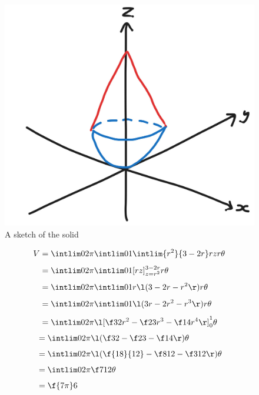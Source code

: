 \documentclass[a4paper]{article}
\begin{document}
\begin{figure}[h]
	\centering
	\includegraphics[scale=0.35]{Q3-sketch}
	\caption{A sketch of the solid}
\end{figure}

\begin{align*}
V &= \intlim 0{2\pi} {\intlim 01 {\intlim {r^2}{3-2r} r z} r} \theta\\[1ex]
&= \intlim 0{2\pi} {\intlim 01 {[rz]_{z=r^2}^{3-2r}} r} \theta\\[1ex]
&= \intlim 0{2\pi} {\intlim 01 {r \l( 3 - 2r - r^2 \r)} r} \theta\\[1ex]
&= \intlim 0{2\pi} {\intlim 01 {\l( 3r - 2r^2 - r^3 \r)} r} \theta\\[1ex]
&= \intlim 0{2\pi} {\l[ \f32 r^2 - \f23 r^3 - \f14 r^4 \r]_0^1} \theta
\end{align*}
\begin{align*}
&= \intlim 0{2\pi} {\l( \f32 - \f23 - \f14 \r)} \theta\\[1ex]
&= \intlim 0{2\pi} {\l( \f{18}{12} - \f8{12} - \f3{12} \r)} \theta\\[1ex]
&= \intlim 0{2\pi} {\f7{12}} \theta\\[1ex]
&= \f{7\pi}6
\end{align*}

\subsection{~} %
\end{document}
